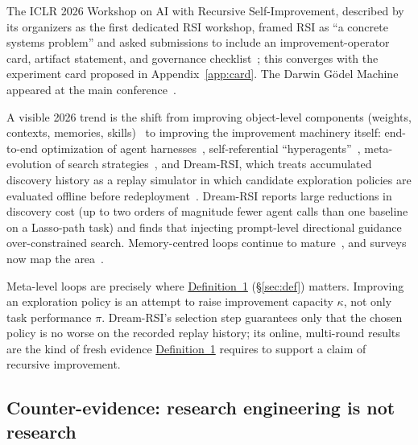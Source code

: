 \documentclass[11pt,a4paper]{article}
\begin{document}
The ICLR 2026 Workshop on AI with Recursive Self-Improvement, described by its organizers as the first dedicated RSI workshop, framed RSI as ``a concrete systems problem'' and asked submissions to include an improvement-operator card, artifact statement, and governance checklist~\cite{iclr-ws}; this converges with the experiment card proposed in Appendix~\ref{app:card}. The Darwin G\"odel Machine appeared at the main conference~\cite{dgm}.

A visible 2026 trend is the shift from improving object-level components (weights, contexts, memories, skills)~\cite{ace,reasoningbank,rzero} to improving the improvement machinery itself: end-to-end optimization of agent harnesses~\cite{metaharness}, self-referential ``hyperagents''~\cite{hyperagents}, meta-evolution of search strategies~\cite{evox}, and Dream-RSI, which treats accumulated discovery history as a replay simulator in which candidate exploration policies are evaluated offline before redeployment~\cite{dreamrsi}. Dream-RSI reports large reductions in discovery cost (up to two orders of magnitude fewer agent calls than one baseline on a Lasso-path task) and finds that injecting prompt-level directional guidance over-constrained search. Memory-centred loops continue to mature~\cite{rsiagent,automem,recuris}, and surveys now map the area~\cite{chen-survey,liu-survey}.

Meta-level loops are precisely where \hyperref[def:rsi]{Definition~1} (\S\ref{sec:def}) matters. Improving an exploration policy is an attempt to raise improvement capacity $\kappa$, not only task performance $\pi$. Dream-RSI's selection step guarantees only that the chosen policy is no worse on the recorded replay history; its online, multi-round results are the kind of fresh evidence \hyperref[def:rsi]{Definition~1} requires to support a claim of recursive improvement.

\subsection{Counter-evidence: research engineering is not research}\label{sec:counter}
\end{document}
